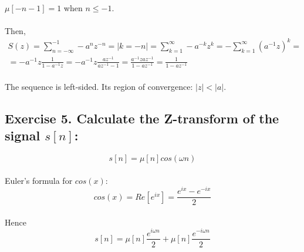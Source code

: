\documentclass[14pt]{article}
\begin{document}
\paragraph{}
$ \mu[-n - 1] = 1 $ when $ n \leq -1 $.

\paragraph{}
Then,
\begin{multline}
	S(z)
	=
	\sum_{n = -\infty}^{-1} -a^n z^{-n}
	=
	|k = -n|
	=
	\sum_{k = 1}^{\infty} -a^{-k} z^{k}
	=
	-\sum_{k = 1}^{\infty} (a^{-1} z)^{k}
	=\\=
	-a^{-1} z \frac{1}{1 - a^{-1} z}
	=
	-a^{-1} z \frac{a z^{-1}}{a z^{-1} - 1}
	=
	\frac{a^{-1} z a z^{-1}}{1 - a z^{-1}}
	=
	\frac{1}{1 - a z^{-1}}
\end{multline}

\paragraph{}
The sequence is left-sided. Its region of convergence: $ |z| < |a| $.

\subsection{Exercise 5. Calculate the Z-transform of the signal 
	$ s[n] $:}
\begin{equation}
	s[n]
	=
	\mu[n] cos(\omega n)
\end{equation}

\paragraph{}
Euler's formula for $ cos (x) $:
\begin{equation}  \label{Cos Euler}
	cos(x)
	=
	Re[e^{i x}]
	=
	\frac{e^{i x} - e^{-i x}}{2}
\end{equation}

\paragraph{}
Hence
\begin{equation}
	s[n]
	=
	\mu[n] \frac{e^{i \omega n}}{2} 
		+ \mu[n] \frac{e^{-i \omega n}}{2}
\end{equation}
\end{document}
